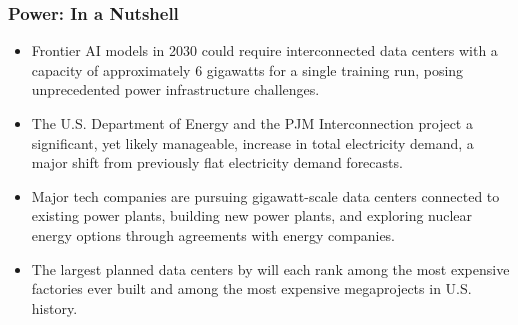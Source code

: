 \documentclass[aspectratio=169]{beamer}
\begin{document}
    \begin{frame}
        \frametitle{Power: In a Nutshell}
        \begin{itemize}
            \item Frontier AI models in 2030 could require interconnected data centers with a capacity of approximately 6 gigawatts for a single training run, posing unprecedented power infrastructure challenges.
            \item The U.S. Department of Energy and the PJM Interconnection project a significant, yet likely manageable, increase in total electricity demand, a major shift from previously flat electricity demand forecasts.
            \item Major tech companies are pursuing gigawatt-scale data centers connected to existing power plants, building new power plants, and exploring nuclear energy options through agreements with energy companies.
            \item The largest planned data centers by will each rank among the most expensive factories ever built and among the most expensive megaprojects in U.S. history.
        \end{itemize}
    \end{frame}
\end{document}
